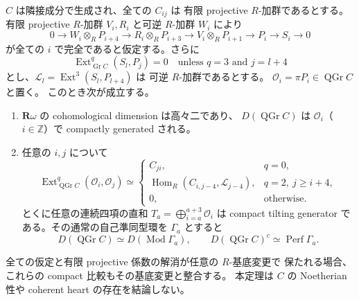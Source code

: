 \begin{theorem}
\label{thm:relative-cubic-tails-tilting}
$C$ は隣接成分で生成され、全ての $C_{ij}$ は
有限 projective $R$-加群であるとする。
有限 projective $R$-加群 $V_i,R_i$ と可逆 $R$-加群 $W_i$ により
\[
 0\longrightarrow W_i\otimes_RP_{i+4}
 \longrightarrow R_i\otimes_RP_{i+3}
 \longrightarrow V_i\otimes_RP_{i+1}
 \longrightarrow P_i\longrightarrow S_i\longrightarrow0
 \tag{CT-res}\label{eq:cubic-tails-simple-resolution}
\]
が全ての $i$ で完全であると仮定する。さらに
\[
 \operatorname{Ext}^q_{\operatorname{Gr}C}(S_l,P_j)=0
 \quad\text{unless }q=3\text{ and }j=l+4
 \tag{CT-dual}\label{eq:cubic-tails-relative-dual}
\]
とし、$\mathcal L_l=\operatorname{Ext}^3(S_l,P_{l+4})$ は
可逆 $R$-加群であるとする。
$\mathcal O_i=\pi P_i\in\operatorname{QGr}C$ と置く。
このとき次が成立する。
\begin{enumerate}
\item $\mathbf R\omega$ の cohomological dimension は高々二であり、
  $D(\operatorname{QGr}C)$ は $\mathcal O_i$（$i\in\mathbb Z$）で
  compactly generated される。
\item 任意の $i,j$ について
  \[
  \operatorname{Ext}^q_{\operatorname{QGr}C}
       (\mathcal O_i,\mathcal O_j)
   \simeq
   \begin{cases}
     C_{ji},&q=0,\\
     \operatorname{Hom}_R(C_{i,j-4},\mathcal L_{j-4}),&q=2,\ j\ge i+4,\\
     0,&\text{otherwise}.
   \end{cases}
  \tag{CT-coh}\label{eq:cubic-tails-line-cohomology}
  \]
  とくに任意の連続四項の直和
  $T_a=\bigoplus_{i=a}^{a+3}\mathcal O_i$ は compact tilting generator
  である。その通常の自己準同型環を $\Gamma_a$ とすると
  \[
    D(\operatorname{QGr}C)\simeq D(\operatorname{Mod}\Gamma_a),\qquad
    D(\operatorname{QGr}C)^c\simeq\operatorname{Perf}\Gamma_a.
    \tag{CT-Morita}\label{eq:cubic-tails-canonical-morita}
  \]
\end{enumerate}
全ての仮定と有限 projective 係数の解消が任意の $R$-基底変更で
保たれる場合、これらの compact 比較もその基底変更と整合する。
本定理は $C$ の Noetherian 性や coherent heart の存在を結論しない。
\end{theorem}

